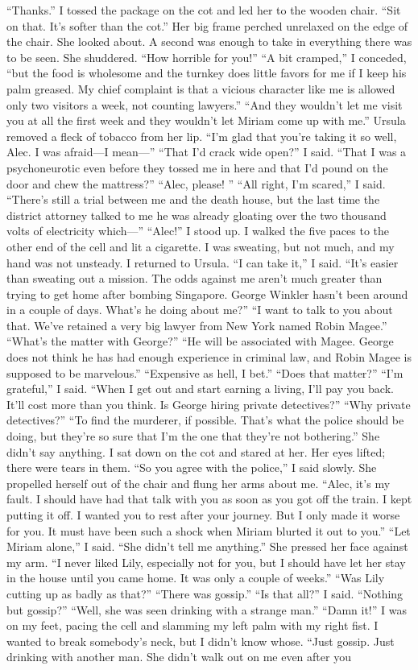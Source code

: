 \documentclass{novel}
\begin{document}
“Thanks.” I tossed the package on the cot and led her to the wooden chair. “Sit on that. It’s softer than the cot.” Her big frame perched unrelaxed on the edge of the chair. She looked about. A second was enough to take in everything there was to be seen. She shuddered. “How horrible for you!” “A bit cramped,” I conceded, “but the food is wholesome and the turnkey does little favors for me if I keep his palm greased. My chief complaint is that a vicious character like me is allowed only two visitors a week, not counting lawyers.” “And they wouldn’t let me visit you at all the first week and they wouldn’t let Miriam come up with me.” Ursula removed a fleck of tobacco from her lip. “I’m glad that you’re taking it so well, Alec. I was afraid—I mean—” “That I’d crack wide open?” I said. “That I was a psychoneurotic even before they tossed me in here and that I’d pound on the door and chew the mattress?” “Alec, please! ” “All right, I’m scared,” I said. “There’s still a trial between me and the death house, but the last time the district attorney talked to me he was already gloating over the two thousand volts of electricity which—” “Alec!” I stood up. I walked the five paces to the other end of the cell and lit a cigarette. I was sweating, but not much, and my hand was not unsteady. I returned to Ursula. “I can take it,” I said. “It’s easier than sweating out a mission. The odds against me aren’t much greater than trying to get home after bombing Singapore. George Winkler hasn’t been around in a couple of days. What’s he doing about me?” “I want to talk to you about that. We’ve retained a very big lawyer from New York named Robin Magee.” “What’s the matter with George?” “He will be associated with Magee. George does not think he has had enough experience in criminal law, and Robin Magee is supposed to be marvelous.” “Expensive as hell, I bet.” “Does that matter?” “I’m grateful,” I said. “When I get out and start earning a living, I’ll pay you back. It’ll cost more than you think. Is George hiring private detectives?” “Why private detectives?” “To find the murderer, if possible. That’s what the police should be doing, but they’re so sure that I’m the one that they’re not bothering.” She didn’t say anything. I sat down on the cot and stared at her. Her eyes lifted; there were tears in them. “So you agree with the police,” I said slowly. She propelled herself out of the chair and flung her arms about me. “Alec, it’s my fault. I should have had that talk with you as soon as you got off the train. I kept putting it off. I wanted you to rest after your journey. But I only made it worse for you. It must have been such a shock when Miriam blurted it out to you.” “Let Miriam alone,” I said. “She didn’t tell me anything.” She pressed her face against my arm. “I never liked Lily, especially not for you, but I should have let her stay in the house until you came home. It was only a couple of weeks.” “Was Lily cutting up as badly as that?” “There was gossip.” “Is that all?” I said. “Nothing but gossip?” “Well, she was seen drinking with a strange man.” “Damn it!” I was on my feet, pacing the cell and slamming my left palm with my right fist. I wanted to break somebody’s neck, but I didn’t know whose. “Just gossip. Just drinking with another man. She didn’t walk out on me even after you 
\end{document}
